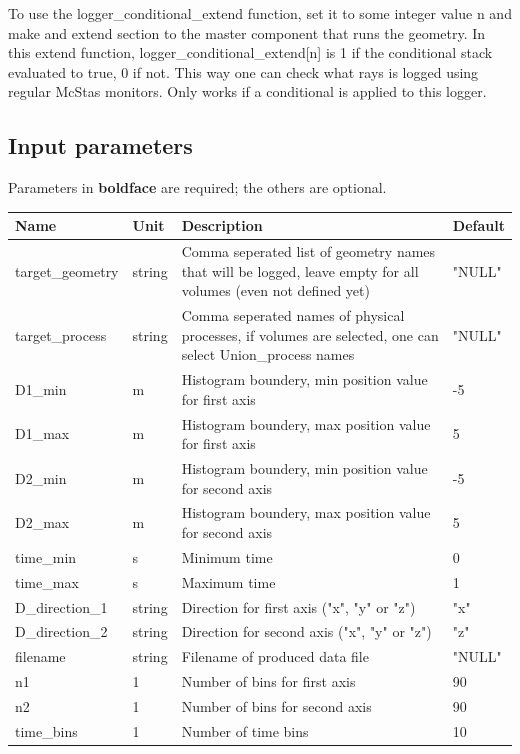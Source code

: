 To use the logger\_conditional\_extend function, set it to some integer value n and make and extend section to the master component that runs the geometry. In this extend function, logger\_conditional\_extend[n] is 1 if the conditional stack evaluated to true, 0 if not. This way one can check what rays is logged using regular McStas monitors. Only works if a conditional is applied to this logger.

\subsection*{Input parameters}
Parameters in \textbf{boldface} are required; the others are optional.

\begin{longtable}{p{}p{}p{}p{}}
\toprule
\textbf{Name} & \textbf{Unit} & \textbf{Description} & \textbf{Default} \\
\midrule
\endhead
target\_geometry & string & Comma seperated list of geometry names that will be logged, leave empty for all volumes (even not defined yet) & "NULL" \\
target\_process & string & Comma seperated names of physical processes, if volumes are selected, one can select Union\_process names & "NULL" \\
D1\_min & m & Histogram boundery, min position value for first axis & -5 \\
D1\_max & m & Histogram boundery, max position value for first axis & 5 \\
D2\_min & m & Histogram boundery, min position value for second axis & -5 \\
D2\_max & m & Histogram boundery, max position value for second axis & 5 \\
time\_min & s & Minimum time & 0 \\
time\_max & s & Maximum time & 1 \\
D\_direction\_1 & string & Direction for first axis ("x", "y" or "z") & "x" \\
D\_direction\_2 & string & Direction for second axis ("x", "y" or "z") & "z" \\
filename & string & Filename of produced data file & "NULL" \\
n1 & 1 & Number of bins for first axis & 90 \\
n2 & 1 & Number of bins for second axis & 90 \\
time\_bins & 1 & Number of time bins & 10 \\

\end{longtable}
